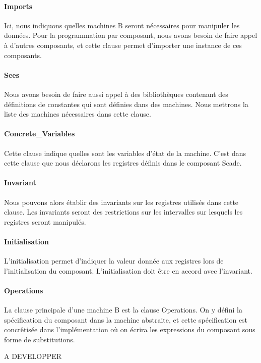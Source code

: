 \paragraph{Imports}
Ici, nous indiquons quelles machines B seront nécessaires pour
manipuler les données. Pour la programmation par composant, nous avons
besoin de faire appel à d'autres composants, et cette clause permet
d'importer une instance de ces composants.

\paragraph{Sees}
Nous avons besoin de faire aussi appel à des bibliothèques contenant
des définitions de constantes qui sont définies dans des
machines. Nous mettrons la liste des machines nécessaires dans cette
clause.  

\paragraph{Concrete\_Variables}
Cette clause indique quelles sont les variables d'état de la
machine. C'est dans cette clause que nous déclarons les registres
définis dans le composant Scade. 

\paragraph{Invariant}
Nous pouvons alors établir des invariants sur les registres utilisés
dans cette clause. Les invariants seront des restrictions sur les
intervalles sur lesquels les registres seront manipulés.

\paragraph{Initialisation}
L'initialisation permet d'indiquer la valeur donnée aux registres lors
de l'initialisation du composant. L'initialisation doit être en accord
avec l'invariant.

\paragraph{Operations}
La clause principale d'une machine B est la clause Operations. On y
défini la spécification du composant dans la machine abstraite, et
cette spécification est concrêtisée dans l'implémentation où on écrira
les expressions du composant sous forme de substitutions.

A DEVELOPPER


